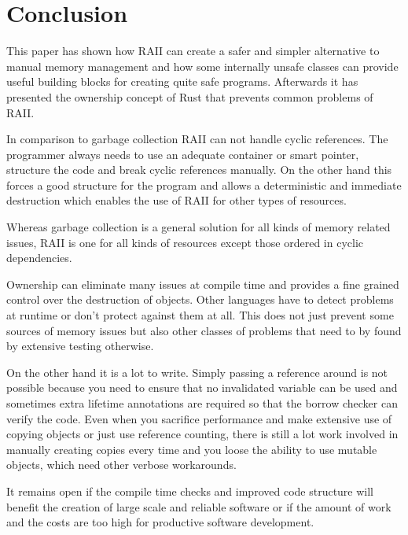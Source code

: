 \documentclass[conference,twocolumn]{IEEEtran}
\begin{document}
\section{Conclusion}

This paper has shown how RAII can create a safer and simpler alternative to manual memory management and how some internally unsafe classes can provide useful building blocks for creating quite safe programs. Afterwards it has presented the ownership concept of Rust that prevents common problems of RAII.

In comparison to garbage collection RAII can not handle cyclic references. The programmer always needs to use an adequate container or smart pointer, structure the code and break cyclic references manually. On the other hand this forces a good structure for the program and allows a deterministic and immediate destruction which enables the use of RAII for other types of resources. 

Whereas garbage collection is a general solution for all kinds of memory related issues, RAII is one for all kinds of resources except those ordered in cyclic dependencies.

Ownership can eliminate many issues at compile time and provides a fine grained control over the destruction of objects.
Other languages have to detect problems at runtime or don't protect against them at all. This does not just prevent some sources of memory issues but also other classes of problems that need to by found by extensive testing otherwise.

On the other hand it is a lot to write. Simply passing a reference around is not possible because you need to ensure that no invalidated variable can be used and sometimes extra lifetime annotations are required so that the borrow checker can verify the code. Even when you sacrifice performance and make extensive use of copying objects or just use reference counting, there is still a lot work involved in manually creating copies every time and you loose the ability to use mutable objects, which need other verbose workarounds.

It remains open if the compile time checks and improved code structure will benefit the creation of large scale and reliable software or if the amount of work and the costs are too high for productive software development.



{}
\end{document}
